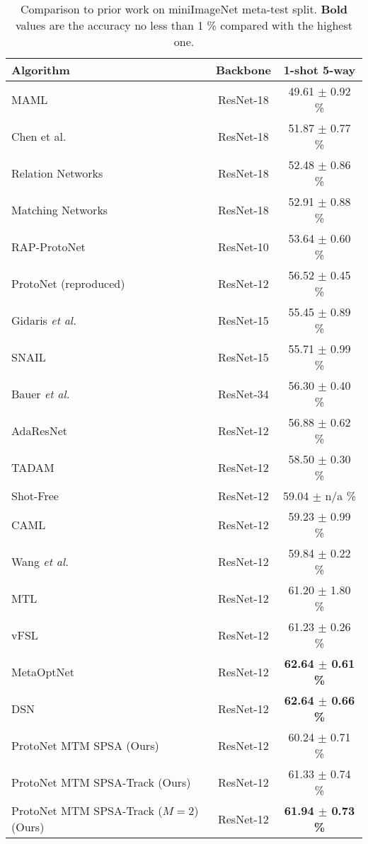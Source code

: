 \documentclass{article}
\begin{document}
\begin{table*}[th]
	\caption{Comparison to prior work on miniImageNet meta-test split. {\bf Bold} values are the accuracy no less than 1 \% compared with the highest one.} 
	\label{table:all-mini-imagenet}
	\begin{center}
		\begin{tabular}{|p{6.5 cm}|c|c|}
			\hline
			Algorithm & Backbone & 1-shot 5-way \\
			\hline
 			MAML~\cite{finn2017model,chen2019closer} & \; ResNet-18 \; & 49.61 $\pm$ 0.92 \% \\
 			Chen et al.~\cite{chen2019closer} & ResNet-18 & 51.87 $\pm$ 0.77 \%  \\
 			Relation Networks~\cite{sung2018learning,chen2019closer} &  ResNet-18 & 52.48 $\pm$ 0.86 \%  \\
 			Matching Networks~\cite{vinyals2016matching,chen2019closer} & ResNet-18 & 52.91 $\pm$ 0.88 \%  \\
			RAP-ProtoNet~\cite{hong2021reinforced} & ResNet-10 & 53.64 $\pm$ 0.60 \% \\
ProtoNet (reproduced)~\cite{NIPS2017_cb8da676} & ResNet-12 & 56.52 $\pm$ 0.45 \%  \\
 			Gidaris  {\it et al.}~\cite{gidaris2018dynamic} & ResNet-15 & 55.45 $\pm$ 0.89 \% \\
			SNAIL~\cite{mishra2017simple} & ResNet-15 &  55.71 $\pm$ 0.99 \% \\
			Bauer  {\it et al.}~\cite{bauer2017discriminative} & ResNet-34 &  56.30 $\pm$ 0.40 \%  \\
			AdaResNet~\cite{munkhdalai2018rapid} & ResNet-12 &  56.88 $\pm$ 0.62 \%  \\
			TADAM~\cite{NEURIPS2018_66808e32} & ResNet-12 &  58.50 $\pm$ 0.30 \% \\
			Shot-Free~\cite{ravichandran2019few} & ResNet-12 &  59.04 $\pm$ n/a \%  \\
			CAML~\cite{jiang2018learning} & ResNet-12 &   59.23 $\pm$ 0.99 \%  \\
			Wang {\it et al.}~\cite{wang2021bridging} & ResNet-12 &   59.84 $\pm$ 0.22 \%  \\
			MTL~\cite{sun2019meta} & ResNet-12 & 61.20 $\pm$ 1.80 \% \\
			vFSL~\cite{zhang2019variational} & ResNet-12 & 61.23 $\pm$ 0.26 \%  \\
			MetaOptNet~\cite{8954109} & ResNet-12 &  \bf{62.64 $\pm$ 0.61 \%}  \\
			DSN~\cite{simon2020adaptive} & ResNet-12 &  \bf{62.64 $\pm$ 0.66} \%  \\
			\hline
			ProtoNet MTM SPSA (Ours) & ResNet-12 & 60.24 $\pm$ 0.71 \%  \\
			ProtoNet MTM SPSA-Track (Ours) & ResNet-12 & 61.33 $\pm$ 0.74 \%   \\
			ProtoNet MTM SPSA-Track ($M=2$) (Ours) & ResNet-12 & \; \bf{61.94 $\pm$ 0.73 \%} \;  \\
			\hline
		\end{tabular}
	\end{center}
\end{table*}
\end{document}

